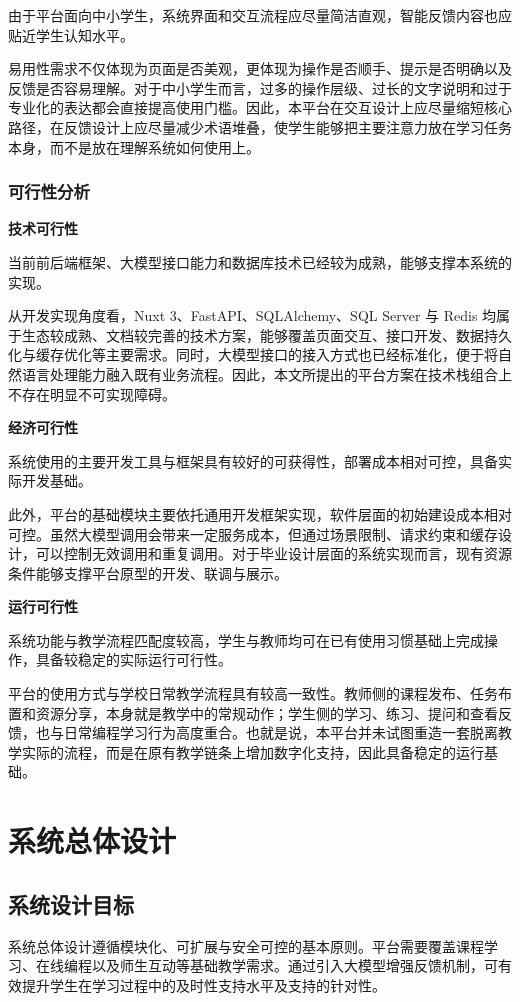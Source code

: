 由于平台面向中小学生，系统界面和交互流程应尽量简洁直观，智能反馈内容也应贴近学生认知水平。

易用性需求不仅体现为页面是否美观，更体现为操作是否顺手、提示是否明确以及反馈是否容易理解。对于中小学生而言，过多的操作层级、过长的文字说明和过于专业化的表达都会直接提高使用门槛。因此，本平台在交互设计上应尽量缩短核心路径，在反馈设计上应尽量减少术语堆叠，使学生能够把主要注意力放在学习任务本身，而不是放在理解系统如何使用上。

\subsection{可行性分析}
\textbf{技术可行性}

当前前后端框架、大模型接口能力和数据库技术已经较为成熟，能够支撑本系统的实现。

从开发实现角度看，Nuxt 3、FastAPI、SQLAlchemy、SQL Server 与 Redis 均属于生态较成熟、文档较完善的技术方案，能够覆盖页面交互、接口开发、数据持久化与缓存优化等主要需求。同时，大模型接口的接入方式也已经标准化，便于将自然语言处理能力融入既有业务流程。因此，本文所提出的平台方案在技术栈组合上不存在明显不可实现障碍。

\textbf{经济可行性}

系统使用的主要开发工具与框架具有较好的可获得性，部署成本相对可控，具备实际开发基础。

此外，平台的基础模块主要依托通用开发框架实现，软件层面的初始建设成本相对可控。虽然大模型调用会带来一定服务成本，但通过场景限制、请求约束和缓存设计，可以控制无效调用和重复调用。对于毕业设计层面的系统实现而言，现有资源条件能够支撑平台原型的开发、联调与展示。

\textbf{运行可行性}

系统功能与教学流程匹配度较高，学生与教师均可在已有使用习惯基础上完成操作，具备较稳定的实际运行可行性。

平台的使用方式与学校日常教学流程具有较高一致性。教师侧的课程发布、任务布置和资源分享，本身就是教学中的常规动作；学生侧的学习、练习、提问和查看反馈，也与日常编程学习行为高度重合。也就是说，本平台并未试图重造一套脱离教学实际的流程，而是在原有教学链条上增加数字化支持，因此具备稳定的运行基础。


\chapter{系统总体设计}

\section{系统设计目标}
系统总体设计遵循模块化、可扩展与安全可控的基本原则。平台需要覆盖课程学习、在线编程以及师生互动等基础教学需求。通过引入大模型增强反馈机制，可有效提升学生在学习过程中的及时性支持水平及支持的针对性。

